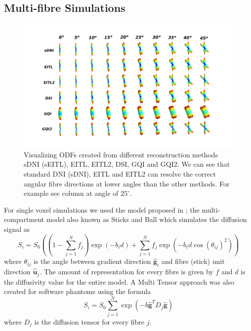 \documentclass{bioinfo}
\begin{document}
\subsection{Multi-fibre Simulations\label{sub:Multi-fiber-Simulations}}

%
\begin{figure}
[th!]

\centering{}\includegraphics[scale=0.6]{figures/low_angles_with_labels}\caption{Visualizing ODFs created from different reconstruction methods sDNI
(sEITL), EITL, EITL2, DSI, GQI and GQI2. We can see that standard
DNI (sDNI), EITL and EITL2 can resolve the correct angular fibre directions
at lower angles than the other methods. For example see column at
angle of $25^{\circ}$. }
\label{Flo:multi-fibre-sims}
\end{figure}


For single voxel simulations we used the model proposed in \citet{Behrens2007NeuroImage}; the multi-compartment model
also known as Sticks and Ball which simulates the diffusion signal
as\begin{equation}
S_{i}=S_{0}((1-\sum_{j=1}^{N}f_{j})\exp(-b_{i}d)+\sum_{j=1}^{N}f_{j}\exp(-b_{i}d\cos(\theta_{ij})^{2}))\label{eq:sticks_ball_eq}\end{equation}
\noindent where $\theta_{ij}$ is the angle between gradient direction
$\mathbf{\hat{g}}_{i}$ and fibre (stick) unit direction $\mathbf{\hat{u}}_{j}$.
The amount of representation for every fibre is given by $f$ and
$d$ is the diffusivity value for the entire model. A Multi Tensor
\citep{liu2004characterizing} approach was also created for software
phantoms using the formula\foreignlanguage{british}{\begin{equation}
S_{i}=S_{0}\sum_{j=1}^{N}\exp(-b\mathbf{\hat{g}}^{T}D_{j}\mathbf{\hat{g}})\label{eq:multitensor}\end{equation}
where $D_{j}$ is the diffusion tensor for every fibre $j$.}
\end{document}
